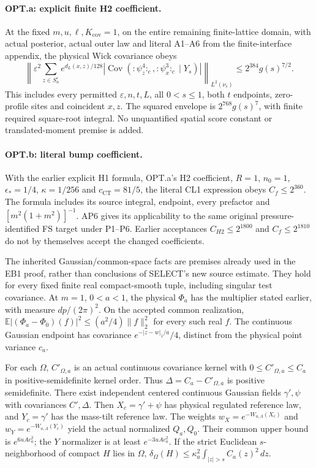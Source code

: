 \documentclass[11pt]{article}
\theoremstyle{plain}
\theoremstyle{definition}
\theoremstyle{remark}
\newcommand{\E}{\mathbb{E}}
\begin{document}
\paragraph{OPT.a: explicit finite H2 coefficient.}
At the fixed $m,u,\ell,K_{\mathrm{cov}}=1$, on the entire remaining
finite-lattice domain, with actual posterior, actual outer law and literal
A1--A6 from the finite-interface appendix, the physical Wick covariance obeys
\[
 \left\|\varepsilon^2\sum_{z\in S_n^\varepsilon}e^{d_L(x,z)/128}
 \left|\operatorname{Cov}({:}\psi_z^4{:}_c,{:}\psi_x^3{:}_c\mid Y_s)\right|
 \right\|_{L^2(\nu_s)}\le2^{384}g(s)^{7/2}.
\]
This includes every permitted $\varepsilon,n,t,L$, all $0<s\le1$, both
$t$ endpoints, zero-profile sites and coincident $x,z$.
The squared envelope is $2^{768}g(s)^7$, with finite required square-root
integral. No unquantified spatial score constant or translated-moment
premise is added.

\paragraph{OPT.b: literal bump coefficient.}
With the earlier explicit H1 formula, OPT.a's H2 coefficient, $R=1$,
$n_0=1$, $\epsilon_*=1/4$, $\kappa=1/256$ and $c_{\mathrm{CT}}=81/5$,
the literal CL1 expression obeys $C_f\le2^{360}$.
The formula includes its source integral, endpoint, every prefactor and
$[m^2(1+m^2)]^{-1}$. AP6 gives its applicability to the same original
pressure-identified FS target under P1--P6. Earlier acceptances
$C_{H2}\le2^{1800}$ and $C_f\le2^{1810}$ do not by themselves accept
the changed coefficients.

The inherited Gaussian/common-space facts are premises already used in
the EB1 proof, rather than conclusions of SELECT's new source estimate.
They hold for every fixed finite real compact-smooth tuple, including
singular test covariance. At $m=1$, $0<a<1$, the physical $\Phi_a$ has
the multiplier stated earlier, with measure $dp/(2\pi)^2$.
On the accepted common realization,
$\E|(\Phi_a-\Phi_0)(f)|^2\le(a^2/4)\|f\|_2^2$ for every such real $f$.
The continuous Gaussian endpoint has covariance $e^{-|z-w|_1/a}/4$,
distinct from the physical point variance $c_a$.

For each $\Omega$, $C'_{\Omega,a}$ is an actual continuous covariance
kernel with $0\le C'_{\Omega,a}\le C_a$ in positive-semidefinite kernel
order. Thus $\Delta=C_a-C'_{\Omega,a}$ is positive semidefinite.
There exist independent centered continuous Gaussian fields $\gamma',\psi$
with covariances $C',\Delta$. Then $X_c=\gamma'+\psi$ has physical
regulated reference law, and $Y_c=\gamma'$ has the mass-tilt reference law.
The weights $w_X=e^{-W_{a,\Lambda}(X_c)}$ and
$w_Y=e^{-W_{a,\Lambda}(Y_c)}$ yield the actual normalized $Q_a,Q_0$.
Their common upper bound is $e^{6uAc_a^2}$; the $Y$ normalizer is at least
$e^{-3uAc_a^2}$. If the strict Euclidean $s$-neighborhood of compact $H$
lies in $\Omega$,
$\delta_\Omega(H)\le\kappa_a^2\int_{|z|>s}C_a(z)^2\,dz$.
\end{document}
